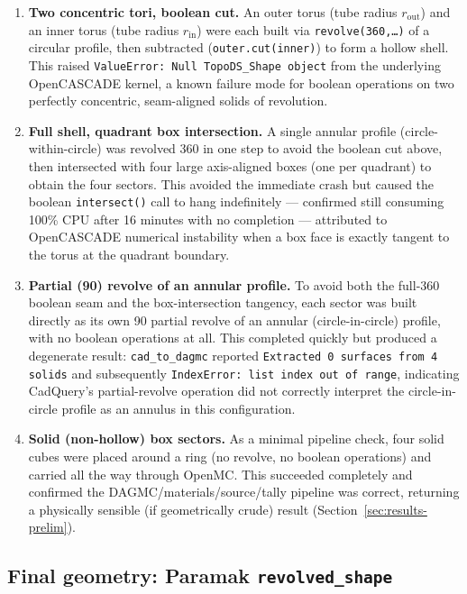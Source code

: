\documentclass[11pt]{article}
\begin{document}
\begin{enumerate}
\item \textbf{Two concentric tori, boolean cut.} An outer torus (tube
radius $r_{\mathrm{out}}$) and an inner torus (tube radius $r_{\mathrm{in}}$)
were each built via \texttt{revolve(360,\ldots)} of a circular profile, then
subtracted (\texttt{outer.cut(inner)}) to form a hollow shell. This raised
\texttt{ValueError: Null TopoDS\_Shape object} from the underlying OpenCASCADE
kernel, a known failure mode for boolean operations on two perfectly
concentric, seam-aligned solids of revolution.
\item \textbf{Full shell, quadrant box intersection.} A single annular
profile (circle-within-circle) was revolved 360\textdegree{} in one step to
avoid the boolean cut above, then intersected with four large
axis-aligned boxes (one per quadrant) to obtain the four sectors. This
avoided the immediate crash but caused the boolean \texttt{intersect()}
call to hang indefinitely --- confirmed still consuming 100\% CPU after 16
minutes with no completion --- attributed to OpenCASCADE numerical
instability when a box face is exactly tangent to the torus at the
quadrant boundary.
\item \textbf{Partial (90\textdegree) revolve of an annular profile.} To
avoid both the full-360\textdegree{} boolean seam and the box-intersection
tangency, each sector was built directly as its own 90\textdegree{} partial
revolve of an annular (circle-in-circle) profile, with no boolean
operations at all. This completed quickly but produced a degenerate result:
\texttt{cad\_to\_dagmc} reported \texttt{Extracted 0 surfaces from 4 solids}
and subsequently \texttt{IndexError: list index out of range}, indicating
CadQuery's partial-revolve operation did not correctly interpret the
circle-in-circle profile as an annulus in this configuration.
\item \textbf{Solid (non-hollow) box sectors.} As a minimal pipeline check,
four solid cubes were placed around a ring (no revolve, no boolean
operations) and carried all the way through OpenMC. This succeeded
completely and confirmed the DAGMC/materials/source/tally pipeline was
correct, returning a physically sensible (if geometrically crude) result
(Section~\ref{sec:results-prelim}).
\end{enumerate}

\subsection{Final geometry: Paramak \texttt{revolved\_shape}}
\end{document}
